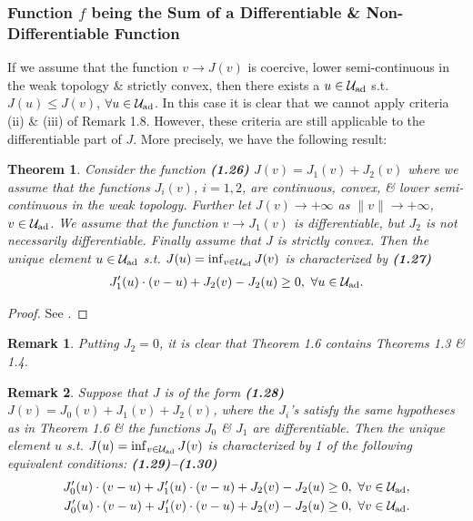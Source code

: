 \documentclass[oneside]{book}
\numberwithin{equation}{section}
\newtheorem{remark}{Remark}[chapter]
\newtheorem{theorem}{Theorem}[chapter]
\begin{document}
\subsubsection{Function $f$ being the Sum of a Differentiable \& Non-Differentiable Function}
If we assume that the function $v\to J(v)$ is coercive, lower semi-continuous in the weak topology \& strictly convex, then there exists a $u\in\mathcal{U}_{\rm ad}$ s.t. $J(u)\le J(v)$, $\forall u\in\mathcal{U}_{\rm ad}$. In this case it is clear that we cannot apply criteria (ii) \& (iii) of Remark 1.8. However, these criteria are still applicable to the differentiable part of $J$. More precisely, we have the following result:

\begin{theorem}
	Consider the function \textbf{(1.26)} $J(v) = J_1(v) + J_2(v)$ where we assume that the functions $J_i(v)$, $i = 1,2$, are continuous, convex, \& lower semi-continuous in the weak topology. Further let $J(v)\to+\infty$ as $\|v\|\to+\infty$, $v\in\mathcal{U}_{\rm ad}$. We assume that the function $v\to J_1(v)$ is differentiable, but $J_2$ is not necessarily differentiable. Finally assume that $J$ is strictly convex. Then the unique element $u\in\mathcal{U}_{\rm ad}$ s.t. $J(u) = \inf_{v\in\mathcal{U}_{\rm ad}} J(v)$ is characterized by \textbf{(1.27)}
	\begin{align*}
		J_1'(u)\cdot(v - u) + J_2(v) - J_2(u)\ge 0,\ \forall u\in\mathcal{U}_{\rm ad}.
	\end{align*}
\end{theorem}

\begin{proof}
	See \cite[pp. 12--13]{Lions1971}.
\end{proof}

\begin{remark}
	Putting $J_2 = 0$, it is clear that Theorem 1.6 contains Theorems 1.3 \& 1.4.
\end{remark}

\begin{remark}
	Suppose that $J$ is of the form \textbf{(1.28)} $J(v) = J_0(v) + J_1(v) + J_2(v)$, where the $J_i$'s satisfy the same hypotheses as in Theorem 1.6 \& the functions $J_0$ \& $J_1$ are differentiable. Then the unique element $u$ s.t. $J(u) = \inf_{v\in\mathcal{U}_{\rm ad}} J(v)$ is characterized by 1 of the following equivalent conditions: \textbf{(1.29)--(1.30)}
	\begin{align*}
		J_0'(u)\cdot(v - u) + J_1'(u)\cdot(v - u) + J_2(v) - J_2(u)&\ge 0,\ \forall v\in\mathcal{U}_{\rm ad},\\
		J_0'(u)\cdot(v - u) + J_1'(v)\cdot(v - u) + J_2(v) - J_2(u)&\ge 0,\ \forall v\in\mathcal{U}_{\rm ad}.
	\end{align*}
\end{remark}
\end{document}
